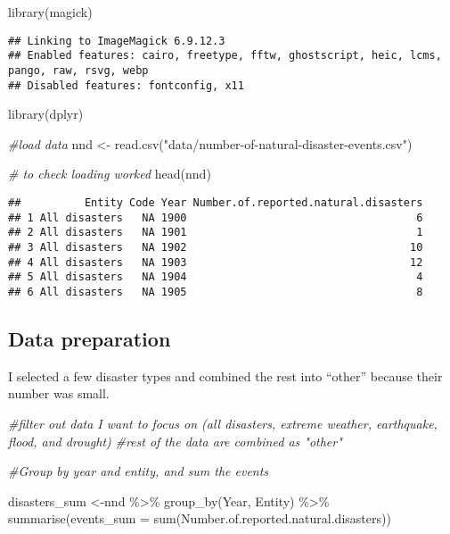 \documentclass[
]{article}
\newenvironment{Shaded}{\begin{snugshade}}{\end{snugshade}}
\newcommand{\AttributeTok}[1]{\textcolor[rgb]{0.77,0.63,0.00}{#1}}
\newcommand{\CommentTok}[1]{\textcolor[rgb]{0.56,0.35,0.01}{\textit{#1}}}
\newcommand{\FunctionTok}[1]{\textcolor[rgb]{0.00,0.00,0.00}{#1}}
\newcommand{\NormalTok}[1]{#1}
\newcommand{\OtherTok}[1]{\textcolor[rgb]{0.56,0.35,0.01}{#1}}
\newcommand{\SpecialCharTok}[1]{\textcolor[rgb]{0.00,0.00,0.00}{#1}}
\newcommand{\StringTok}[1]{\textcolor[rgb]{0.31,0.60,0.02}{#1}}
\begin{document}
\begin{Shaded}
\begin{Highlighting}[]
\FunctionTok{library}\NormalTok{(magick)}
\end{Highlighting}
\end{Shaded}

\begin{verbatim}
## Linking to ImageMagick 6.9.12.3
## Enabled features: cairo, freetype, fftw, ghostscript, heic, lcms, pango, raw, rsvg, webp
## Disabled features: fontconfig, x11
\end{verbatim}

\begin{Shaded}
\begin{Highlighting}[]
\FunctionTok{library}\NormalTok{(dplyr)}

\CommentTok{\#load data}
\NormalTok{nnd }\OtherTok{\textless{}{-}} \FunctionTok{read.csv}\NormalTok{(}\StringTok{"data/number{-}of{-}natural{-}disaster{-}events.csv"}\NormalTok{)}

\CommentTok{\# to check loading worked}
\FunctionTok{head}\NormalTok{(nnd)}
\end{Highlighting}
\end{Shaded}

\begin{verbatim}
##          Entity Code Year Number.of.reported.natural.disasters
## 1 All disasters   NA 1900                                    6
## 2 All disasters   NA 1901                                    1
## 3 All disasters   NA 1902                                   10
## 4 All disasters   NA 1903                                   12
## 5 All disasters   NA 1904                                    4
## 6 All disasters   NA 1905                                    8
\end{verbatim}

\hypertarget{data-preparation}{%
\subsection{Data preparation}\label{data-preparation}}

I selected a few disaster types and combined the rest into ``other''
because their number was small.

\begin{Shaded}
\begin{Highlighting}[]
\CommentTok{\#filter out data I want to focus on (all disasters, extreme weather, earthquake, flood, and drought)}
\CommentTok{\#rest of the data are combined as "other"}

\CommentTok{\#Group by year and entity, and sum the events}

\NormalTok{disasters\_sum }\OtherTok{\textless{}{-}}\NormalTok{nnd }\SpecialCharTok{\%\textgreater{}\%} 
  \FunctionTok{group\_by}\NormalTok{(Year, Entity) }\SpecialCharTok{\%\textgreater{}\%}
  \FunctionTok{summarise}\NormalTok{(}\AttributeTok{events\_sum =} \FunctionTok{sum}\NormalTok{(Number.of.reported.natural.disasters))}
\end{Highlighting}
\end{Shaded}
\end{document}
